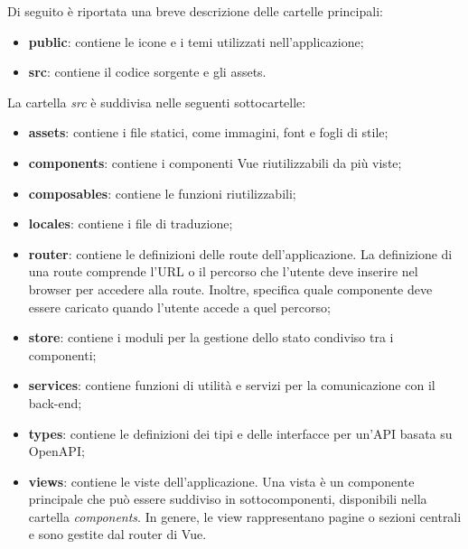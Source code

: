 \vspace{0.5\baselineskip}
\par Di seguito è riportata una breve descrizione delle cartelle principali:
\begin{itemize}
  \item \textbf{public}: contiene le icone e i temi utilizzati nell'applicazione;
  \item \textbf{src}: contiene il codice sorgente e gli assets.
\end{itemize}

\vspace{0.5\baselineskip}
\par La cartella \textit{src} è suddivisa nelle seguenti sottocartelle:
\begin{itemize}
  \item \textbf{assets}: contiene i file statici, come immagini, font e fogli di stile;
  \item \textbf{components}: contiene i componenti Vue riutilizzabili da più viste;
  \item \textbf{composables}: contiene le funzioni riutilizzabili;
  \item \textbf{locales}: contiene i file  di traduzione;
  \item \textbf{router}: contiene le definizioni delle route dell'applicazione. La definizione di una route comprende l'URL o il percorso che l'utente deve inserire nel browser per accedere alla route. Inoltre, specifica quale componente deve essere caricato quando l'utente accede a quel percorso;
  \item \textbf{store}: contiene i moduli per la gestione dello stato condiviso tra i componenti;
  \item \textbf{services}: contiene funzioni di utilità e servizi per la comunicazione con il back-end;
  \item \textbf{types}: contiene le definizioni dei tipi e delle interfacce per un'API basata su OpenAPI;
  \item \textbf{views}: contiene le viste dell'applicazione. Una vista è un componente principale che può essere suddiviso in sottocomponenti, disponibili nella cartella \textit{components}. In genere, le view rappresentano pagine o sezioni centrali e sono gestite dal router di Vue.
\end{itemize}
